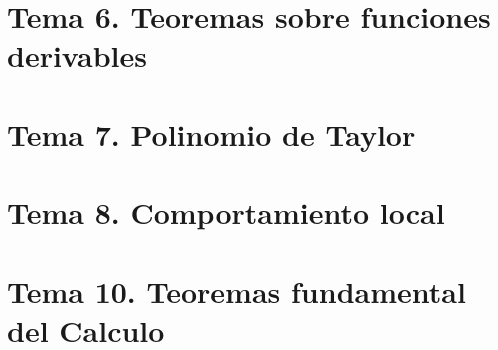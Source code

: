 \documentclass[12pt]{report} %
\begin{document}
\part{Tema 6. Teoremas sobre funciones derivables}











\part{Tema 7. Polinomio de Taylor}





















\part{Tema 8. Comportamiento local}







\part{Tema 10. Teoremas fundamental del Calculo}














\end{document}
